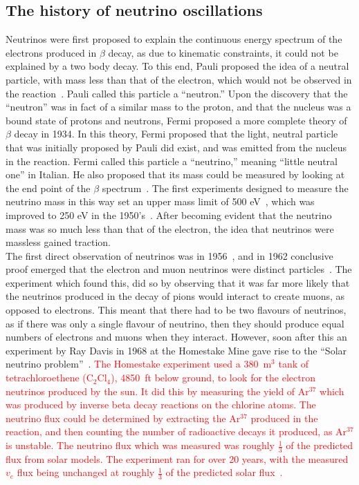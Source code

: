 \subsection{The history of neutrino oscillations} \label{Neut_Hist}
Neutrinos were first proposed to explain the continuous energy spectrum of the electrons produced in $\beta$ decay, as due to kinematic constraints, it could not be explained by a two body decay. To this end, Pauli proposed the idea of a neutral particle, with mass less than that of the electron, which would not be observed in the reaction~\citep{Pauli}. Pauli called this particle a ``neutron.'' Upon the discovery that the ``neutron'' was in fact of a similar mass to the proton, and that the nucleus was a bound state of protons and neutrons, Fermi proposed a more complete theory of $\beta$ decay in 1934. In this theory, Fermi proposed that the light, neutral particle that was initially proposed by Pauli did exist, and was emitted from the nucleus in the reaction. Fermi called this particle a ``neutrino,'' meaning ``little neutral one'' in Italian. He also proposed that its mass could be measured by looking at the end point of the $\beta$ spectrum~\citep{Fermi:1934hr}. The first experiments designed to measure the neutrino mass in this way set an upper mass limit of 500 eV~\citep{NeutMassLim1, NeutMassLim2}, which was improved to 250 eV in the 1950's~\citep{NeutMassLim3}. After becoming evident that the neutrino mass was so much less than that of the electron, the idea that neutrinos were massless gained traction. \\

The first direct observation of neutrinos was in 1956~\citep{Cowan:1992xc}, and in 1962 conclusive proof emerged that the electron and muon neutrinos were distinct particles~\citep{PhysRevLett.9.36}. The experiment which found this, did so by observing that it was far more likely that the neutrinos produced in the decay of pions would interact to create muons, as opposed to electrons. This meant that there had to be two flavours of neutrinos, as if there was only a single flavour of neutrino, then they should produce equal numbers of electrons and muons when they interact. However, soon after this an experiment by Ray Davis in 1968 at the Homestake Mine gave rise to the ``Solar neutrino problem''~\citep{RayDavis1968}. \textcolor{red}{The Homestake experiment used a 380~m$^{3}$ tank of tetrachloroethene (C$_{2}$Cl$_{4}$), 4850~ft below ground, to look for the electron neutrinos produced by the sun. It did this by measuring the yield of Ar$^{37}$ which was produced by inverse beta decay reactions on the chlorine atoms. The neutrino flux could be determined by extracting the Ar$^{37}$ produced in the reaction, and then counting the number of radioactive decays it produced, as Ar$^{37}$ is unstable. The neutrino flux which was measured was roughly $\frac{1}{3}$ of the predicted flux from solar models. The experiment ran for over 20 years, with the measured $v_{e}$ flux being unchanged at roughly $\frac{1}{3}$ of the predicted solar flux~\citep{RayDavis1988}.} \\


